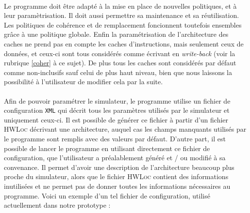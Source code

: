 \paragraph{}
Le programme doit être adapté à la mise en place de nouvelles politiques, et à leur paramètrisation. Il doit aussi permettre sa maintenance et sa réutilisation. Les politiques de cohérence et de remplacement foncionnent toutefois ensembles grâce à une politique globale. Enfin la paramétrisation de l'architecture des caches ne prend pas en compte les caches d'instructions, mais seulement ceux de données, et ceux-ci sont tous considérés comme écrivant en \emph{write-back} (voir la rubrique \ref{coher} à ce sujet). De plus tous les caches sont considérés par défaut comme non-inclusifs sauf celui de plus haut niveau, bien que nous laissons la possibilité à l'utilisateur de modifier cela par la suite.

\paragraph{}
Afin de pouvoir paramétrer le simulateur, le programme utilise un fichier de configuration \texttt{XML} qui décrit tous les paramètres utilisés par le simulateur et uniquement ceux-ci. Il est possible de générer ce fichier à partir d'un fichier \textsc{HWLoc} décrivant une architecture, auquel cas les champs manquants utilisés par le programme sont remplis avec des valeurs par défaut. D'autre part, il est possible de lancer le programme en utilisant directement ce fichier de configuration, que l'utilisateur a préalablement généré et / ou modifié à sa convenance. Il permet d'avoir une description de l'architecture beaucoup plus proche du simulateur, alors que le fichier \textsc{HWLoc} contient des informations inutilisées et ne permet pas de donner toutes les informations nécessaires au programme. Voici un exemple d'un tel fichier de configuration, utilisé actuellement dans notre prototype :

\newpage

